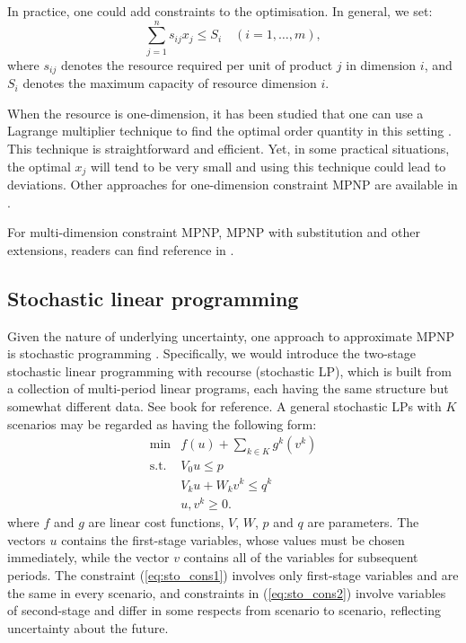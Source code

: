 \documentclass[a4paper,11pt]{article}
\begin{document}
In practice, one could add constraints to the optimisation. In general, we set:
\[
    \sum_{j=1}^n s_{ij} x_j \le S_i	\quad (i = 1, \ldots, m),
\]
where $s_{ij}$ denotes the resource required per unit of product $j$ in dimension $i$, and $S_i$ denotes the maximum capacity of resource dimension $i$.

When the resource is one-dimension, it has been studied that one can use a Lagrange multiplier technique to find the optimal order quantity in this setting \cite{HW63}. This technique is straightforward and efficient. Yet, in some practical situations, the optimal $x_j$ will tend to be very small and using this technique could lead to deviations. Other approaches for one-dimension constraint MPNP are available in \cite{ALM05,NS84,ZXH09,Zh10}.

For multi-dimension constraint MPNP, MPNP with substitution and other extensions, readers can find reference in \cite{BAA99,BR93,CVW14,LL95,MS78}. 

\subsection{Stochastic linear programming}
Given the nature of underlying uncertainty, one approach to approximate MPNP is stochastic programming \cite{Bea55,D98}. Specifically, we would introduce the two-stage stochastic linear programming with recourse (stochastic LP), which is built from a collection of multi-period linear programs, each having the same structure but somewhat different data. See book \cite{HS13,KM76,KWK94,Pf12} for reference. A general stochastic LPs with $K$ scenarios may be regarded as having the following form:
\begin{eqnarray}
\label{eq:sto_obj}
    \min	& f ( u ) + \sum_{k \in K} g^k ( v^k )\\
\label{eq:sto_cons1}
	\text{s.t.}    & V_0 u \leq p\\
\label{eq:sto_cons2}
	& V_k u +W_k v^k \leq q^k\\
\label{eq:sto_posi}
	& u, v^k \geq 0.
\end{eqnarray}
where $f$ and $g$ are linear cost functions, $V$, $W$, $p$ and $q$ are parameters. The vectors $u$ contains the first-stage variables, whose values must be chosen immediately, while the vector $v$ contains all of the variables for subsequent periods. The constraint (\ref{eq:sto_cons1}) involves only first-stage variables and are the same in every scenario, and constraints in (\ref{eq:sto_cons2}) involve variables of second-stage and differ in some respects from scenario to scenario, reflecting uncertainty about the future.
\end{document}
